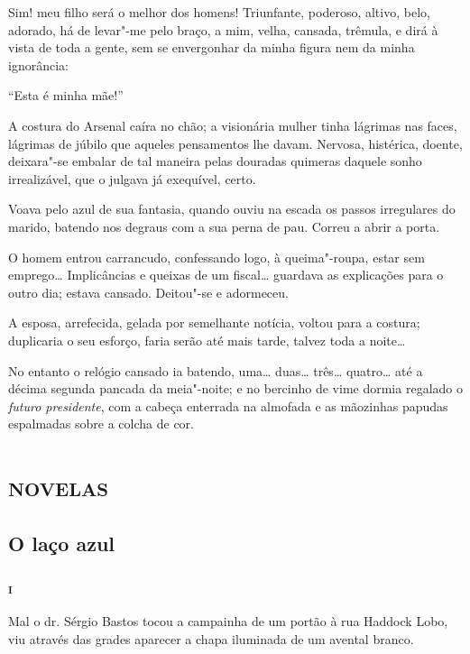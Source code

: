 Sim! meu filho será o melhor dos homens! Triunfante, poderoso, altivo,
belo, adorado, há de levar"-me pelo braço, a mim, velha, cansada,
trêmula, e dirá à vista de toda a gente, sem se envergonhar da minha
figura nem da minha ignorância:

``Esta é minha mãe!''

A costura do Arsenal caíra no chão; a visionária mulher tinha lágrimas
nas faces, lágrimas de júbilo que aqueles pensamentos lhe davam.
Nervosa, histérica, doente, deixara"-se embalar de tal maneira pelas
douradas quimeras daquele sonho irrealizável, que o julgava já
exequível, certo.

Voava pelo azul de sua fantasia, quando ouviu na escada os passos
irregulares do marido, batendo nos degraus com a sua perna de pau.
Correu a abrir a porta.

O homem entrou carrancudo, confessando logo, à queima"-roupa, estar sem
emprego\ldots{} Implicâncias e queixas de um fiscal\ldots{} guardava as
explicações para o outro dia; estava cansado. Deitou"-se e adormeceu.

A esposa, arrefecida, gelada por semelhante notícia, voltou para a
costura; duplicaria o seu esforço, faria serão até mais tarde, talvez
toda a noite\ldots{}

No entanto o relógio cansado ia batendo, uma\ldots{} duas\ldots{} três\ldots{}
quatro\ldots{} até a décima segunda pancada da meia"-noite; e no bercinho de
vime dormia regalado o \emph{futuro presidente}, com a cabeça enterrada
na almofada e as mãozinhas papudas espalmadas sobre a colcha de cor.


\part{\textsc{novelas}}

\chapter[O laço azul]{O laço azul}



\section*{\textsc{i}}

Mal o dr. Sérgio Bastos tocou a campainha de um portão à rua Haddock
Lobo, viu através das grades aparecer a chapa iluminada de um avental
branco.


